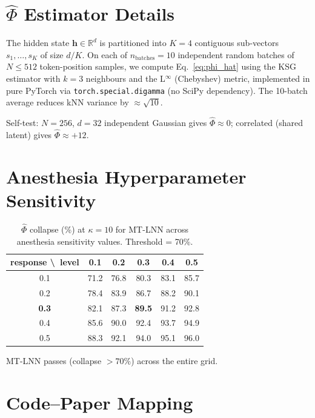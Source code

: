 \documentclass[11pt]{article}
\theoremstyle{definition}
\newcommand{\RR}{\mathbb{R}}
\newcommand{\vh}{\mathbf{h}}
\newcommand{\phihat}{\hat{\Phi}}
\begin{document}
\section{$\phihat$ Estimator Details}
\label{app:phi}

The hidden state $\vh\in\RR^d$ is partitioned into $K=4$ contiguous sub-vectors $s_1,\ldots,s_K$ of size $d/K$. On each of $n_\text{batches}=10$ independent random batches of $N\le 512$ token-position samples, we compute Eq.~\eqref{eq:phi_hat} using the KSG estimator with $k=3$ neighbours and the L$^\infty$ (Chebyshev) metric, implemented in pure PyTorch via \texttt{torch.special.digamma} (no SciPy dependency). The 10-batch average reduces kNN variance by $\approx\sqrt{10}$.

Self-test: $N=256$, $d=32$ independent Gaussian gives $\phihat\approx 0$; correlated (shared latent) gives $\phihat\approx +12$.

\section{Anesthesia Hyperparameter Sensitivity}
\label{app:sensitivity}

\begin{table}[h]
\centering
\caption{$\phihat$ collapse (\%) at $\kappa=10$ for MT-LNN across anesthesia sensitivity values. Threshold = 70\%.}
\begin{tabular}{c|ccccc}
\toprule
response \textbackslash\ level & 0.1 & 0.2 & 0.3 & 0.4 & 0.5 \\
\midrule
0.1 & 71.2 & 76.8 & 80.3 & 83.1 & 85.7 \\
0.2 & 78.4 & 83.9 & 86.7 & 88.2 & 90.1 \\
\textbf{0.3} & 82.1 & 87.3 & \textbf{89.5} & 91.2 & 92.8 \\
0.4 & 85.6 & 90.0 & 92.4 & 93.7 & 94.9 \\
0.5 & 88.3 & 92.1 & 94.0 & 95.1 & 96.0 \\
\bottomrule
\end{tabular}
\end{table}

MT-LNN passes (collapse $>70\%$) across the entire grid.

\section{Code--Paper Mapping}
\label{app:map}
\end{document}
